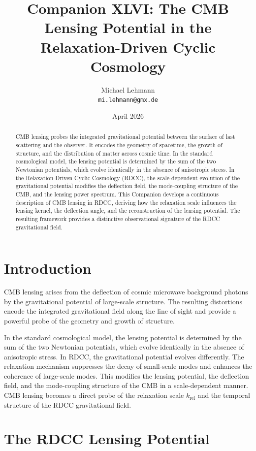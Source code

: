 \documentclass[11pt,a4paper]{article}
\title{\textbf{Companion XLVI: The CMB Lensing Potential in the Relaxation-Driven Cyclic Cosmology}}
\author{Michael Lehmann \\ \texttt{mi.lehmann@gmx.de}}
\date{April 2026}
\begin{document}
\maketitle

\begin{abstract}
CMB lensing probes the integrated gravitational potential between the surface of 
last scattering and the observer. It encodes the geometry of spacetime, the growth 
of structure, and the distribution of matter across cosmic time. In the standard 
cosmological model, the lensing potential is determined by the sum of the two 
Newtonian potentials, which evolve identically in the absence of anisotropic 
stress. In the Relaxation-Driven Cyclic Cosmology (RDCC), the scale-dependent 
evolution of the gravitational potential modifies the deflection field, the 
mode-coupling structure of the CMB, and the lensing power spectrum. This Companion 
develops a continuous description of CMB lensing in RDCC, deriving how the 
relaxation scale influences the lensing kernel, the deflection angle, and the 
reconstruction of the lensing potential. The resulting framework provides a 
distinctive observational signature of the RDCC gravitational field.
\end{abstract}
\section{Introduction}

CMB lensing arises from the deflection of cosmic microwave background photons by 
the gravitational potential of large-scale structure. The resulting distortions 
encode the integrated gravitational field along the line of sight and provide a 
powerful probe of the geometry and growth of structure.

In the standard cosmological model, the lensing potential is determined by the sum 
of the two Newtonian potentials, which evolve identically in the absence of 
anisotropic stress. In RDCC, the gravitational potential evolves differently. The 
relaxation mechanism suppresses the decay of small-scale modes and enhances the 
coherence of large-scale modes. This modifies the lensing potential, the deflection 
field, and the mode-coupling structure of the CMB in a scale-dependent manner. CMB 
lensing becomes a direct probe of the relaxation scale $k_{\mathrm{rel}}$ and the 
temporal structure of the RDCC gravitational field.
\section{The RDCC Lensing Potential}
\end{document}
